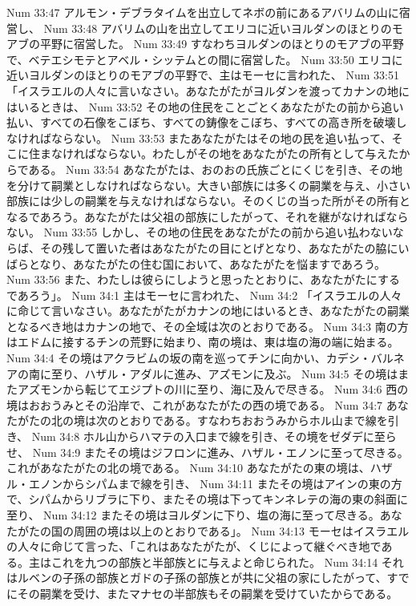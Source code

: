 Num 33:47  アルモン・デブラタイムを出立してネボの前にあるアバリムの山に宿営し、
Num 33:48  アバリムの山を出立してエリコに近いヨルダンのほとりのモアブの平野に宿営した。
Num 33:49  すなわちヨルダンのほとりのモアブの平野で、ベテエシモテとアベル・シッテムとの間に宿営した。
Num 33:50  エリコに近いヨルダンのほとりのモアブの平野で、主はモーセに言われた、
Num 33:51  「イスラエルの人々に言いなさい。あなたがたがヨルダンを渡ってカナンの地にはいるときは、
Num 33:52  その地の住民をことごとくあなたがたの前から追い払い、すべての石像をこぼち、すべての鋳像をこぼち、すべての高き所を破壊しなければならない。
Num 33:53  またあなたがたはその地の民を追い払って、そこに住まなければならない。わたしがその地をあなたがたの所有として与えたからである。
Num 33:54  あなたがたは、おのおの氏族ごとにくじを引き、その地を分けて嗣業としなければならない。大きい部族には多くの嗣業を与え、小さい部族には少しの嗣業を与えなければならない。そのくじの当った所がその所有となるであろう。あなたがたは父祖の部族にしたがって、それを継がなければならない。
Num 33:55  しかし、その地の住民をあなたがたの前から追い払わないならば、その残して置いた者はあなたがたの目にとげとなり、あなたがたの脇にいばらとなり、あなたがたの住む国において、あなたがたを悩ますであろう。
Num 33:56  また、わたしは彼らにしようと思ったとおりに、あなたがたにするであろう」。
Num 34:1  主はモーセに言われた、
Num 34:2  「イスラエルの人々に命じて言いなさい。あなたがたがカナンの地にはいるとき、あなたがたの嗣業となるべき地はカナンの地で、その全域は次のとおりである。
Num 34:3  南の方はエドムに接するチンの荒野に始まり、南の境は、東は塩の海の端に始まる。
Num 34:4  その境はアクラビムの坂の南を巡ってチンに向かい、カデシ・バルネアの南に至り、ハザル・アダルに進み、アズモンに及ぶ。
Num 34:5  その境はまたアズモンから転じてエジプトの川に至り、海に及んで尽きる。
Num 34:6  西の境はおおうみとその沿岸で、これがあなたがたの西の境である。
Num 34:7  あなたがたの北の境は次のとおりである。すなわちおおうみからホル山まで線を引き、
Num 34:8  ホル山からハマテの入口まで線を引き、その境をゼダデに至らせ、
Num 34:9  またその境はジフロンに進み、ハザル・エノンに至って尽きる。これがあなたがたの北の境である。
Num 34:10  あなたがたの東の境は、ハザル・エノンからシパムまで線を引き、
Num 34:11  またその境はアインの東の方で、シパムからリブラに下り、またその境は下ってキンネレテの海の東の斜面に至り、
Num 34:12  またその境はヨルダンに下り、塩の海に至って尽きる。あなたがたの国の周囲の境は以上のとおりである」。
Num 34:13  モーセはイスラエルの人々に命じて言った、「これはあなたがたが、くじによって継ぐべき地である。主はこれを九つの部族と半部族とに与えよと命じられた。
Num 34:14  それはルベンの子孫の部族とガドの子孫の部族とが共に父祖の家にしたがって、すでにその嗣業を受け、またマナセの半部族もその嗣業を受けていたからである。
